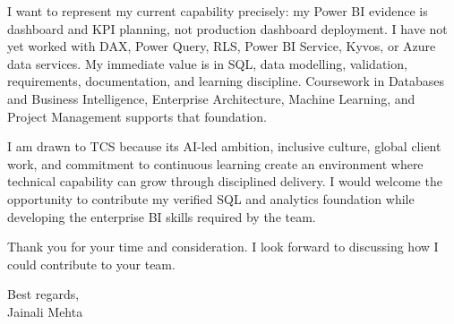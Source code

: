 \documentclass[letterpaper,10pt]{article}
\begin{document}
I want to represent my current capability precisely: my Power BI evidence is dashboard and KPI planning, not production dashboard deployment. I have not yet worked with DAX, Power Query, RLS, Power BI Service, Kyvos, or Azure data services. My immediate value is in SQL, data modelling, validation, requirements, documentation, and learning discipline. Coursework in Databases and Business Intelligence, Enterprise Architecture, Machine Learning, and Project Management supports that foundation.

I am drawn to TCS because its AI-led ambition, inclusive culture, global client work, and commitment to continuous learning create an environment where technical capability can grow through disciplined delivery. I would welcome the opportunity to contribute my verified SQL and analytics foundation while developing the enterprise BI skills required by the team.

Thank you for your time and consideration. I look forward to discussing how I could contribute to your team.

Best regards,\\[8pt]
Jainali Mehta
\end{document}
